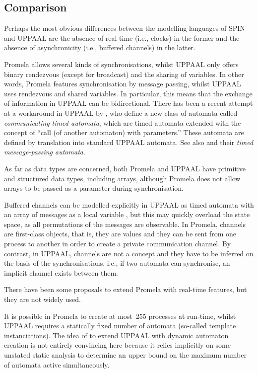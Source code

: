 \documentclass[a4paper,11pt,twoside]{article}
\newcommand\SPIN{\textsf{SPIN}\xspace}
\newcommand\Promela{\textsf{Promela}\xspace}
\newcommand\UPPAAL{\textsf{UPPAAL}\xspace}
\begin{document}
\subsection{Comparison}

Perhaps the most obvious differences between the modelling languages
of \SPIN and \UPPAAL are the absence of real\hyp{}time (i.e., clocks)
in the former and the absence of asynchronicity (i.e., buffered
channels) in the latter.

\Promela allows several kinds of synchronisations, whilst \UPPAAL only
offers binary rendezvous (except for broadcast) and the sharing of
variables. In other words, \Promela features synchronisation by
message passing, whilst \UPPAAL uses rendezvous and shared
variables. In particular, this means that the exchange of information
in \UPPAAL can be bidirectional. There has been a recent attempt at a
workaround in \UPPAAL by \citet{Boudjadar_et_al:2013}, who define a
new class of automata called \emph{communicating timed automata},
which are timed automata extended with the concept of ``call (of
another automaton) with parameters.'' These automata are defined by
translation into standard \UPPAAL automata. See also
\citet{ChandrasekaranMukund:2006} and their \emph{timed
  message\hyp{}passing automata}.

As far as data types are concerned, both \Promela and \UPPAAL have
primitive and structured data types, including arrays, although
\Promela does not allow arrays to be passed as a parameter during
synchronisation.

Buffered channels can be modelled explicitly in \UPPAAL as timed
automata with an array of messages as a local variable
\citep{ChandrasekaranMukund:2006}, but this may quickly overload the
state space, as all permutations of the messages are observable. In \Promela, channels are first\hyp{}class objects, that is, they are
values and they can be sent from one process to another in order to
create a private communication channel. By contrast, in \UPPAAL,
channels are not a concept and they have to be inferred on the basis
of the synchronisations, i.e., if two automata can synchronise, an
implicit channel exists between them.

There have been some proposals
\citep{TripakisCourcoubetis:1996,Bosnacki:2002,NabialekJanowskaJanowski:2008}
to extend \Promela with real\hyp{}time features, but they are not
widely used.

It is possible in \Promela to create at most~255 processes at
run\hyp{}time, whilst \UPPAAL requires a statically fixed number of
automata (so\hyp{}called template instanciations). The idea of
\citet{Boudjadar_et_al:2013} to extend \UPPAAL with dynamic automaton
creation is not entirely convincing here because it relies implicitly
on some unstated static analysis to determine an upper bound on the
maximum number of automata active simultaneously.
\end{document}

